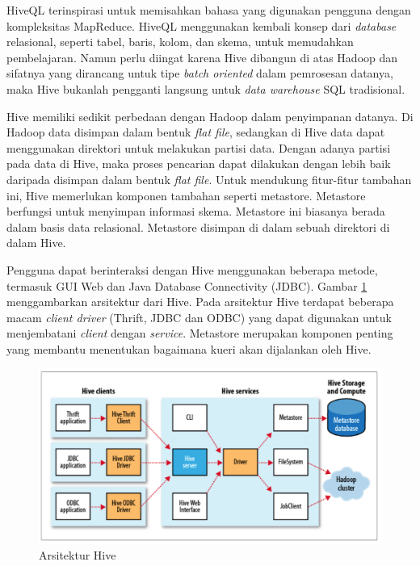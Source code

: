 HiveQL terinspirasi untuk memisahkan bahasa yang digunakan pengguna dengan kompleksitas MapReduce. HiveQL menggunakan kembali konsep dari \textit{database} relasional, seperti tabel, baris, kolom, dan skema, untuk memudahkan pembelajaran. Namun perlu diingat karena Hive dibangun di atas Hadoop dan sifatnya yang dirancang untuk tipe \textit{batch oriented} dalam pemrosesan datanya, maka Hive bukanlah pengganti langsung untuk \textit{data warehouse} SQL tradisional.

Hive memiliki sedikit perbedaan dengan Hadoop dalam penyimpanan datanya. Di Hadoop data disimpan dalam bentuk \textit{flat file}, sedangkan di Hive data dapat menggunakan direktori untuk melakukan partisi data. Dengan adanya partisi pada data di Hive, maka proses pencarian dapat dilakukan dengan lebih baik daripada disimpan dalam bentuk \textit{flat file}. Untuk mendukung fitur-fitur tambahan ini, Hive memerlukan komponen tambahan seperti metastore. Metastore berfungsi untuk menyimpan informasi skema. Metastore ini biasanya berada dalam basis data relasional. Metastore disimpan di dalam sebuah direktori di dalam Hive.

Pengguna dapat berinteraksi dengan Hive menggunakan beberapa metode, termasuk GUI Web dan Java Database Connectivity (JDBC). Gambar \ref{fig:hive_architecture} menggambarkan arsitektur dari Hive. Pada arsitektur Hive terdapat beberapa macam \textit{client driver} (Thrift, JDBC dan ODBC) yang dapat digunakan untuk menjembatani \textit{client} dengan \textit{service}. Metastore merupakan komponen penting yang membantu menentukan bagaimana kueri akan dijalankan oleh Hive.

\begin{figure}
	\centering
	\includegraphics[scale=0.4]{Gambar/arsitektur-hive.png}
	\caption[Arsitektur Hive]{Arsitektur Hive\cite{white2012hadoop}} 
	\label{fig:hive_architecture}
\end{figure}

